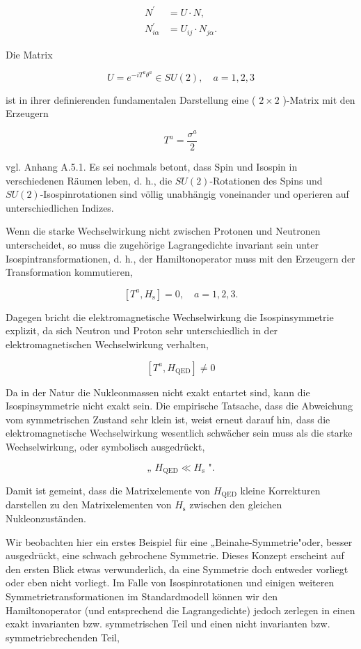 \documentclass[10pt, letterpaper]{article}
\begin{document}
$$
\begin{aligned}
N^{\prime} & =U \cdot N, \\
N_{i \alpha}^{\prime} & =U_{i j} \cdot N_{j \alpha} .
\end{aligned}
$$

Die Matrix

$$
U=e^{-i T^{a} \theta^{a}} \in S U(2), \quad a=1,2,3
$$

ist in ihrer definierenden fundamentalen Darstellung eine ( $2 \times 2$ )-Matrix mit den Erzeugern

$$
T^{a}=\frac{\sigma^{a}}{2}
$$

vgl. Anhang A.5.1. Es sei nochmals betont, dass Spin und Isospin in verschiedenen Räumen leben, d. h., die $S U(2)$-Rotationen des Spins und $S U(2)$-Isospinrotationen sind völlig unabhängig voneinander und operieren auf unterschiedlichen Indizes.

Wenn die starke Wechselwirkung nicht zwischen Protonen und Neutronen unterscheidet, so muss die zugehörige Lagrangedichte invariant sein unter Isospintransformationen, d. h., der Hamiltonoperator muss mit den Erzeugern der Transformation kommutieren,

$$
\left[T^{a}, H_{\mathrm{s}}\right]=0, \quad a=1,2,3 .
$$

Dagegen bricht die elektromagnetische Wechselwirkung die Isospinsymmetrie explizit, da sich Neutron und Proton sehr unterschiedlich in der elektromagnetischen Wechselwirkung verhalten,

$$
\left[T^{a}, H_{\mathrm{QED}}\right] \neq 0
$$

Da in der Natur die Nukleonmassen nicht exakt entartet sind, kann die Isospinsymmetrie nicht exakt sein. Die empirische Tatsache, dass die Abweichung vom symmetrischen Zustand sehr klein ist, weist erneut darauf hin, dass die elektromagnetische Wechselwirkung wesentlich schwächer sein muss als die starke Wechselwirkung, oder symbolisch ausgedrückt,

$$
\text { „ } H_{\mathrm{QED}} \ll H_{\mathrm{s}} \text { ". }
$$

Damit ist gemeint, dass die Matrixelemente von $H_{\mathrm{QED}}$ kleine Korrekturen darstellen zu den Matrixelementen von $H_{\mathrm{s}}$ zwischen den gleichen Nukleonzuständen.

Wir beobachten hier ein erstes Beispiel für eine „Beinahe-Symmetrie"oder, besser ausgedrückt, eine schwach gebrochene Symmetrie. Dieses Konzept erscheint auf den ersten Blick etwas verwunderlich, da eine Symmetrie doch entweder vorliegt oder eben nicht vorliegt. Im Falle von Isospinrotationen und einigen weiteren Symmetrietransformationen im Standardmodell können wir den Hamiltonoperator (und entsprechend die Lagrangedichte) jedoch zerlegen in einen exakt invarianten bzw. symmetrischen Teil und einen nicht invarianten bzw. symmetriebrechenden Teil,
\end{document}
